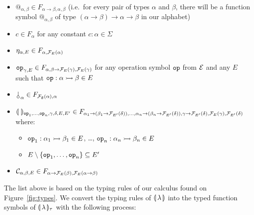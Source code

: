 \begin{itemize}
\item $@_{\alpha, \beta} \in F_{\alpha \to \beta, \alpha, \beta}$
  (i.e.\ for every pair of types $\alpha$ and $\beta$, there will be a
  function symbol $@_{\alpha,\beta}$ of type $(\alpha \to \beta) \to
  \alpha \to \beta$ in our alphabet)
\item $c \in F_{\alpha}$ for any constant $c : \alpha \in \Sigma$
\item $\eta_{\alpha, E} \in F_{\alpha, \mathcal{F}_E(\alpha)}$
\item $\mathtt{op}_{\gamma, E} \in F_{\alpha, \beta \to \mathcal{F}_E(\gamma),
  \mathcal{F}_E(\gamma)}$ for any operation symbol $\mathtt{op}$ from $\mathcal{E}$ and any $E$
  such that $\mathtt{op} : \alpha \rightarrowtail \beta \in E$
\item $\cherry_\alpha \in F_{\FF_\emptyset(\alpha), \alpha}$
\item $\llparenthesis \,  \, \rrparenthesis_{\mathtt{op}_1, \ldots, \mathtt{op}_n, \gamma, \delta, E, E'} \in F_{\alpha_1 \to (\beta_1 \to \mathcal{F}_{E'}(\delta)), \ldots,
  \alpha_n \to (\beta_n \to \mathcal{F}_{E'}(\delta)), \gamma \to \mathcal{F}_{E'}(\delta),
  \mathcal{F}_E(\gamma), \mathcal{F}_{E'}(\delta)}$ where:
  \begin{itemize}
  \item $\mathtt{op}_1 : \alpha_1 \rightarrowtail \beta_1 \in E$, \ldots,
    $\mathtt{op}_n : \alpha_n \rightarrowtail \beta_n \in E$
  \item $E \setminus \{\mathtt{op}_1, \ldots, \mathtt{op}_n\} \subseteq E'$
  \end{itemize}
\item $\mathcal{C}_{\alpha,\beta,E} \in F_{\alpha \to \mathcal{F}_E(\beta),\mathcal{F}_E(\alpha \to
  \beta)}$
\end{itemize}

The list above is based on the typing rules of our calculus found on
Figure~\ref{fig:types}. We convert the typing rules of $\llparenthesis \, \lambda \, \rrparenthesis$
into the typed function symbols of $\llparenthesis \, \lambda \, \rrparenthesis_\tau$ with the
following process:

